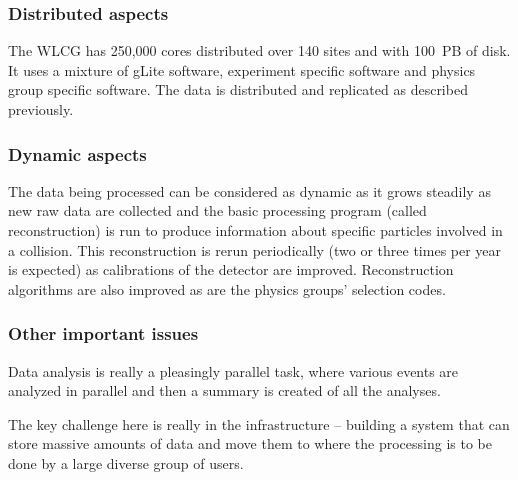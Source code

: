  \subsubsection*{Distributed aspects}



The WLCG has 250,000 cores distributed over 140 sites and with 100~PB of disk. It uses a mixture of gLite software, experiment specific software and physics group specific software.  The data is distributed and replicated as described previously.

 \subsubsection*{Dynamic aspects}



The data being processed can be considered as dynamic as it grows steadily as new raw data are collected and the basic processing program (called reconstruction) is run to produce information about specific particles involved in a collision. This reconstruction is rerun periodically (two or three times per year is expected) as calibrations of the detector are improved. Reconstruction algorithms are also improved as are the physics groups' selection codes.

 \subsubsection*{Other important issues}



Data analysis is really a pleasingly parallel task, where various events are analyzed in parallel and then a summary is created of all the analyses.

The key challenge here is really in the infrastructure -- building a system that can store massive amounts of data and move them to where the processing is to be done by a large diverse group of users.



